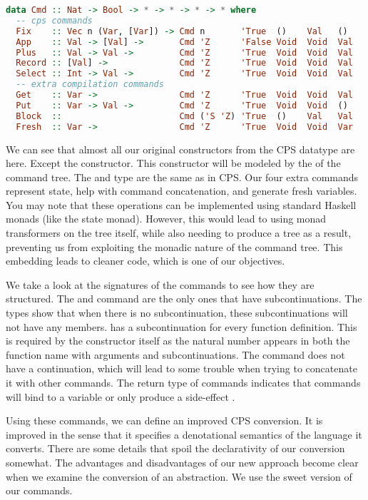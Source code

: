 \begin{lstlisting}[language=Haskell]
data Cmd :: Nat -> Bool -> * -> * -> * -> * where
  -- cps commands
  Fix    :: Vec n (Var, [Var]) -> Cmd n       'True  ()    Val   ()
  App    :: Val -> [Val] ->       Cmd 'Z      'False Void  Void  Val 
  Plus   :: Val -> Val ->         Cmd 'Z      'True  Void  Void  Val
  Record :: [Val] ->              Cmd 'Z      'True  Void  Void  Val
  Select :: Int -> Val ->         Cmd 'Z      'True  Void  Void  Val
  -- extra compilation commands
  Get    :: Var ->                Cmd 'Z      'True  Void  Void  Val
  Put    :: Var -> Val ->         Cmd 'Z      'True  Void  Void  ()
  Block  ::                       Cmd ('S 'Z) 'True  ()    Val   Val
  Fresh  :: Var ->                Cmd 'Z      'True  Void  Void  Var
\end{lstlisting}

We can see that almost all our original constructors from the \ac{CPS} datatype are here. Except the  constructor. This constructor will be modeled by the  of the command tree. The  and  type are the same as in \ac{CPS}. Our four extra commands represent state, help with command concatenation, and generate fresh variables. You may note that these operations can be implemented using standard Haskell monads (like the state monad). However, this would lead to using monad transformers on the tree itself, while also needing to produce a tree as a result, preventing us from exploiting the monadic nature of the command tree. This embedding leads to cleaner code, which is one of our objectives.

We take a look at the signatures of the commands to see how they are structured. The  and  command are the only ones that have subcontinuations. The  types show that when there is no subcontinuation, these subcontinuations will not have any members.  has a subcontinuation for every function definition. This is required by the constructor itself as the natural number  appears in both the function name with arguments and subcontinuations. The  command does not have a continuation, which will lead to some trouble when trying to concatenate it with other commands. The return type of commands indicates that commands will bind to a variable  or only produce a side-effect \lstinlineb{()}.

Using these commands, we can define an improved \ac{CPS} conversion. It is improved in the sense that it specifies a denotational semantics\autocite{DBLP:conf/tacs/CartwrightF94} of the language it converts. There are some details that spoil the declarativity of our conversion somewhat. The advantages and disadvantages of our new approach become clear when we examine the conversion of an abstraction. We use the sweet version of our commands.

